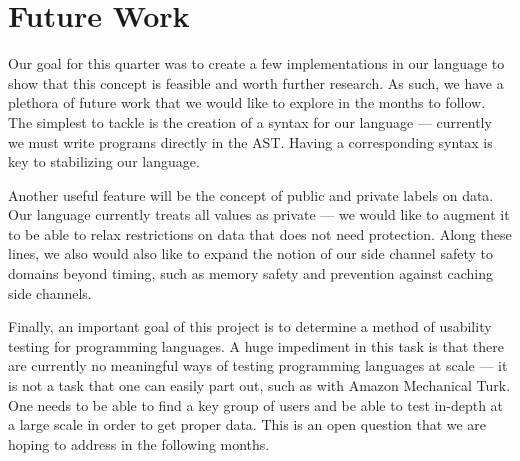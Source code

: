\section{Future Work}
\label{sec:future}

Our goal for this quarter was to create a few implementations in our language to
show that this concept is feasible and worth further research. As such, we have a
plethora of future work that we would like to explore in the months to follow.
The simplest to tackle is the creation of a syntax for our
language --- currently we must write programs directly in the AST.
Having a corresponding syntax is key to stabilizing our language.

Another useful feature will be the concept of public and private labels on data.
Our language currently treats all values as private --- we would like to augment it
to be able to relax restrictions on data that does not need protection.
Along these lines, we also would also like to expand
the notion of our side channel safety to domains beyond timing, such as memory safety and
prevention against caching side channels.

Finally, an important goal of this project is to determine a method of usability
testing for programming languages. A huge impediment in this task is that there
are currently no meaningful ways of testing programming languages at scale --- it is not a task that
one can easily part out, such as with Amazon Mechanical Turk\cite{mechanicalturk}. One needs to
be able to find a key group of users and be able to test in-depth at a large scale
in order to get proper data. This is an open question that we are hoping to
address in the following months.
